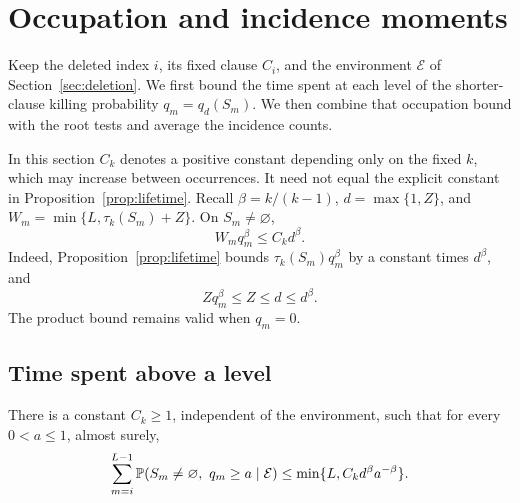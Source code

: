 \section{Occupation and incidence moments}
\label{sec:occupation}

Keep the deleted index \(i\), its fixed clause \(C_i\), and the
environment \(\mathcal E\) of Section~\ref{sec:deletion}.  We first
bound the time spent at each level of the shorter-clause killing
probability \(q_m=q_d(S_m)\).  We then combine that occupation bound
with the root tests and average the incidence counts.

In this section \(C_k\) denotes a positive constant depending only on
the fixed \(k\), which may increase between occurrences.  It need not
equal the explicit constant in Proposition~\ref{prop:lifetime}.
Recall \(\beta=k/(k-1)\), \(d=\max\{1,Z\}\), and
\(W_m=\min\{L,\tau_k(S_m)+Z\}\).  On \(S_m\ne\varnothing\),
\begin{equation}\label{eq:weighted-lifetime-product}
 W_m q_m^\beta\le C_kd^\beta.
\end{equation}
Indeed, Proposition~\ref{prop:lifetime} bounds
\(\tau_k(S_m)q_m^\beta\) by a constant times \(d^\beta\), and
\[
 Zq_m^\beta\le Z\le d\le d^\beta.
\]
The product bound remains valid when \(q_m=0\).

\subsection{Time spent above a level}

\begin{lemma}\label{lem:conditional-occupation}
There is a constant \(C_k\ge1\), independent of the environment,
such that for every \(0<a\le1\), almost surely,
\begin{equation}\label{eq:conditional-occupation}
 \sum_{m=i}^{L-1}
 \mathbb P(S_m\ne\varnothing,\ q_m\ge a\mid\mathcal E)
 \le\min\{L,C_kd^\beta a^{-\beta}\}.
\end{equation}
\end{lemma}

